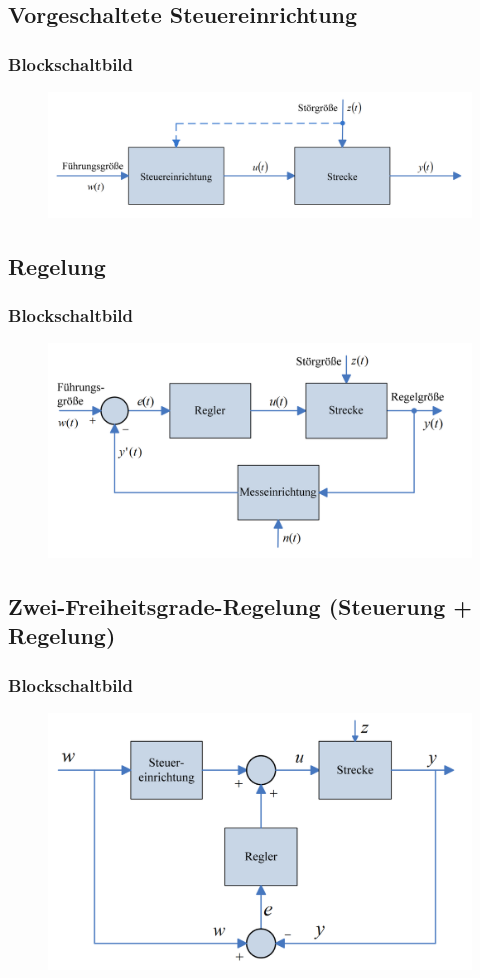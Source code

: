 \documentclass[10pt,a4paper]{article}
\begin{document}
\subsection{Vorgeschaltete Steuereinrichtung}
\label{steuerung}
\subsubsection*{Blockschaltbild}
\begin{figure}[H]
	\includegraphics[width=0.6\columnwidth]{imgs/abb1_4.png}
\end{figure}

\subsection{Regelung}
\label{regelung}
\subsubsection*{Blockschaltbild}
\begin{figure}[H]
	\includegraphics[width=0.6\columnwidth]{imgs/abb1_6.png}
\end{figure}

\subsection{Zwei-Freiheitsgrade-Regelung (Steuerung + Regelung)}
\subsubsection*{Blockschaltbild}
\begin{figure}[H]
	\includegraphics[width=0.6\columnwidth]{imgs/abb1_8.png}
\end{figure}
\end{document}
